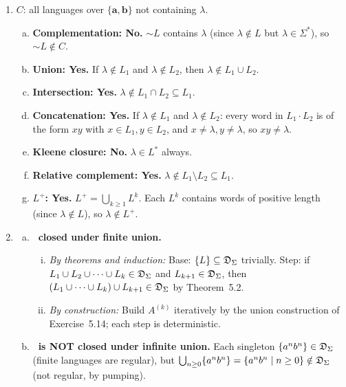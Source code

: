 \begin{enumerate}[{5.}1. ]
\item $C$: all languages over $\{\pmb{a},\pmb{b}\}$ not containing $\lambda$.

\begin{enumerate}[(a)]
  \item \textbf{Complementation: No.}  $\sim L$ contains $\lambda$ (since $\lambda\notin L$ but $\lambda\in\Sigma^*$), so $\sim L\notin C$.

  \item \textbf{Union: Yes.}  If $\lambda\notin L_1$ and $\lambda\notin L_2$, then $\lambda\notin L_1\cup L_2$.

  \item \textbf{Intersection: Yes.}  $\lambda\notin L_1\cap L_2\subseteq L_1$.

  \item \textbf{Concatenation: Yes.}  If $\lambda\notin L_1$ and $\lambda\notin L_2$: every word in $L_1\cdot L_2$ is of the form $xy$ with $x\in L_1,y\in L_2$, and $x\neq\lambda,y\neq\lambda$, so $xy\neq\lambda$.

  \item \textbf{Kleene closure: No.}  $\lambda\in L^*$ always.

  \item \textbf{Relative complement: Yes.}  $\lambda\notin L_1\setminus L_2\subseteq L_1$.

  \item \textbf{$L^+$: Yes.}  $L^+=\bigcup_{k\ge 1}L^k$.  Each $L^k$ contains words of positive length (since $\lambda\notin L$), so $\lambda\notin L^+$.
\end{enumerate}

\item \begin{enumerate}[(a)]
  \item \textbf{\DSIG\ closed under finite union.}
  \begin{enumerate}[(i)]
    \item \emph{By theorems and induction:}  Base: $\{L\}\subseteq\mathfrak{D}_\Sigma$ trivially.  Step: if $L_1\cup L_2\cup\cdots\cup L_k\in\mathfrak{D}_\Sigma$ and $L_{k+1}\in\mathfrak{D}_\Sigma$, then $(L_1\cup\cdots\cup L_k)\cup L_{k+1}\in\mathfrak{D}_\Sigma$ by Theorem~5.2.
    \item \emph{By construction:}  Build $A^{(k)}$ iteratively by the union construction of Exercise~5.14; each step is deterministic.
  \end{enumerate}
  \item \textbf{\DSIG\ is NOT closed under infinite union.}  Each singleton $\{a^nb^n\}\in\mathfrak{D}_\Sigma$ (finite languages are regular), but $\bigcup_{n\ge 0}\{a^nb^n\}=\{a^nb^n\mid n\ge 0\}\notin\mathfrak{D}_\Sigma$ (not regular, by pumping).
\end{enumerate}


\end{enumerate}
